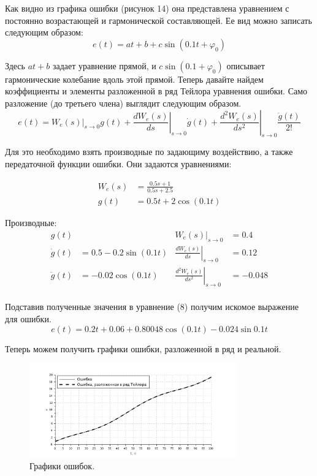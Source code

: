 \documentclass[a4paper, 11pt]{article}
\begin{document}
Как видно из графика ошибки (рисунок 14) она представлена уравнением с постоянно возрастающей и гармонической составляющей. Ее вид можно записать следующим образом: 
\begin{equation}
    e(t) = at + b + c\sin{(0.1t + \varphi_0)}
\end{equation}
\par
Здесь $at + b$ задает уравнение прямой, и $c\sin{(0.1 + \varphi_0)}$ описывает гармонические колебание вдоль этой прямой. Теперь давайте найдем коэффициенты и элементы разложенной в ряд Тейлора уравнения ошибки. Само разложение (до третьего члена) выглядит следующим образом. 
\begin{equation}
    e(t) = W_e(s)|_{s\rightarrow0}g(t) + \left.\frac{dW_e(s)}{ds}\right|_{s\rightarrow0}\dot{g}(t) + \left.\frac{d^2W_e(s)}{ds^2}\right|_{s\rightarrow0}\frac{\ddot{g}(t)}{2!}
\end{equation}

Для это необходимо взять производные по задающиму воздействию, а также передаточной функции ошибки. Они задаются уравнениями: 

\begin{align}
    W_{e}(s) & = \frac{0.5s + 1}{0.5s + 2.5} \\ 
    g(t) & = 0.5t + 2\cos{(0.1t)}
\end{align}
\par

Производные:
\begin{align*}
    g(t) & & W_e(s)|_{s\rightarrow0} & = 0.4 \\
    \dot{g}(t) & = 0.5 - 0.2\sin{(0.1t)} & \left.\frac{dW_e(s)}{ds}\right|_{s\rightarrow0} & = 0.12 \\
    \ddot{g}(t) & = -0.02\cos{(0.1t)} & \left.\frac{d^2W_e(s)}{ds^2}\right|_{s\rightarrow0} & = -0.048 \\
\end{align*}
\par

Подставив полученные значения в уравнение (8) получим искомое выражение для ошибки.
\begin{equation}
    e(t) = 0.2t + 0.06 + 0.80048\cos{(0.1t)} - 0.024\sin{0.1t}
\end{equation}
\par
Теперь можем получить графики ошибки, разложенной в ряд и реальной.
\begin{figure}[h!]
    \centering
    \includegraphics[width = 0.8\textwidth]{images/graph4withTailor.pdf}
    \caption{Графики ошибок.}
\end{figure}
\end{document}

